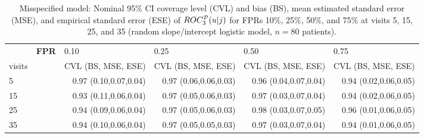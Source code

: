 \begin{table}[ht]
\centering
\begin{tabular}{ll |rrrr}
  \hline
             & \textbf{FPR} & \multicolumn{1}{l}{                  0.10} & \multicolumn{1}{l}{                  0.25} & \multicolumn{1}{l}{                  0.50} & \multicolumn{1}{l}{                  0.75} \\ 
  visits &             & \multicolumn{1}{l}{CVL (BS, MSE, ESE)                      } & \multicolumn{1}{l}{ CVL (BS, MSE, ESE)                     } & \multicolumn{1}{l}{ CVL (BS, MSE, ESE)                     } & \multicolumn{1}{l}{      CVL (BS, MSE, ESE)                } \\ 
   \hline
5           &               & 0.97 (0.10,0.07,0.04) & 0.97 (0.06,0.06,0.03) & 0.96 (0.04,0.07,0.04) & 0.94 (0.02,0.06,0.05) \\ 
  15          &               & 0.93 (0.11,0.06,0.04) & 0.97 (0.05,0.06,0.03) & 0.97 (0.03,0.07,0.04) & 0.94 (0.02,0.06,0.05) \\ 
  25          &               & 0.94 (0.09,0.06,0.04) & 0.97 (0.05,0.06,0.03) & 0.98 (0.03,0.07,0.05) & 0.96 (0.01,0.06,0.05) \\ 
  35          &               & 0.94 (0.10,0.06,0.04) & 0.97 (0.05,0.05,0.03) & 0.97 (0.03,0.07,0.04) & 0.94 (0.01,0.06,0.05) \\ 
   \hline
\end{tabular}
\caption{Misspecified model: Nominal 95\% CI coverage level (CVL) and bias (BS), mean estimated standard error (MSE), and empirical standard error (ESE) of $ROC_3^{\cal P}(u|j)$ for FPRs 10\%, 25\%, 50\%, and 75\% at visits 5, 15, 25, and 35 (random slope/intercept logistic model, $n=80$ patients).} 
\label{tab:2}
\end{table}
